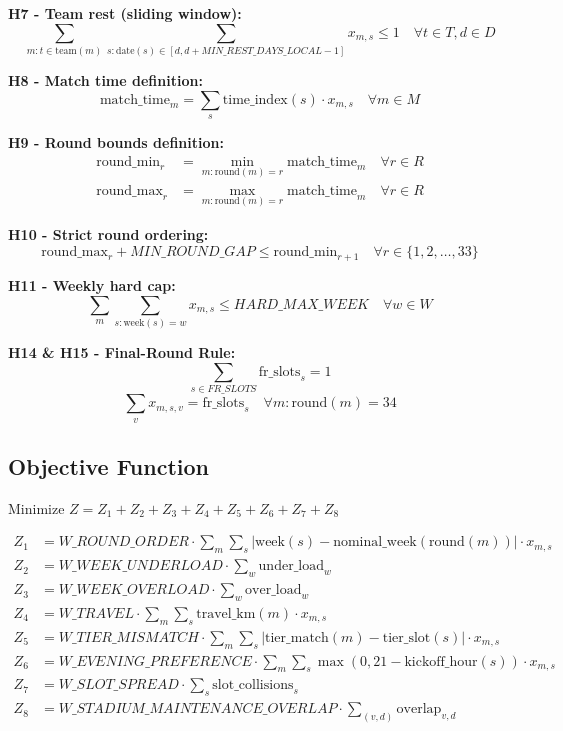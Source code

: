 \documentclass[a4paper,11pt]{article}
\begin{document}
\textbf{H7 - Team rest (sliding window):}
\begin{equation}
\sum_{m: t \in \text{team}(m)} \sum_{s: \text{date}(s) \in [d, d+MIN\_REST\_DAYS\_LOCAL-1]} x_{m,s} \le 1 \quad \forall t \in T, d \in D
\end{equation}

\textbf{H8 - Match time definition:}
\begin{equation}
\text{match\_time}_m = \sum_{s} \text{time\_index}(s) \cdot x_{m,s} \quad \forall m \in M
\end{equation}

\textbf{H9 - Round bounds definition:}
\begin{align}
\text{round\_min}_r &= \min_{m: \text{round}(m)=r} \text{match\_time}_m \quad \forall r \in R \\
\text{round\_max}_r &= \max_{m: \text{round}(m)=r} \text{match\_time}_m \quad \forall r \in R
\end{align}

\textbf{H10 - Strict round ordering:}
\begin{equation}
\text{round\_max}_r + MIN\_ROUND\_GAP \le \text{round\_min}_{r+1} \quad \forall r \in \{1, 2, \dots, 33\}
\end{equation}

\textbf{H11 - Weekly hard cap:}
\begin{equation}
\sum_{m} \sum_{s: \text{week}(s)=w} x_{m,s} \le HARD\_MAX\_WEEK \quad \forall w \in W
\end{equation}

\textbf{H14 \& H15 - Final-Round Rule:}
\begin{equation}
\sum_{s \in FR\_SLOTS} \text{fr\_slots}_s = 1
\end{equation}
\begin{equation}
\sum_{v} x_{m,s,v} = \text{fr\_slots}_s \quad \forall m: \text{round}(m)=34
\end{equation}

\subsection{Objective Function}
Minimize $Z = Z_1 + Z_2 + Z_3 + Z_4 + Z_5 + Z_6 + Z_7 + Z_8$

\begin{align}
Z_1 &= W\_ROUND\_ORDER \cdot \sum_{m} \sum_{s} |\text{week}(s) - \text{nominal\_week}(\text{round}(m))| \cdot x_{m,s} \\
Z_2 &= W\_WEEK\_UNDERLOAD \cdot \sum_{w} \text{under\_load}_w \\
Z_3 &= W\_WEEK\_OVERLOAD \cdot \sum_{w} \text{over\_load}_w \\
Z_4 &= W\_TRAVEL \cdot \sum_{m} \sum_{s} \text{travel\_km}(m) \cdot x_{m,s} \\
Z_5 &= W\_TIER\_MISMATCH \cdot \sum_{m} \sum_{s} |\text{tier\_match}(m) - \text{tier\_slot}(s)| \cdot x_{m,s} \\
Z_6 &= W\_EVENING\_PREFERENCE \cdot \sum_{m} \sum_{s} \max(0, 21 - \text{kickoff\_hour}(s)) \cdot x_{m,s} \\
Z_7 &= W\_SLOT\_SPREAD \cdot \sum_{s} \text{slot\_collisions}_s \\
Z_8 &= W\_STADIUM\_MAINTENANCE\_OVERLAP \cdot \sum_{(v,d)} \text{overlap}_{v,d}
\end{align}
\end{document}
